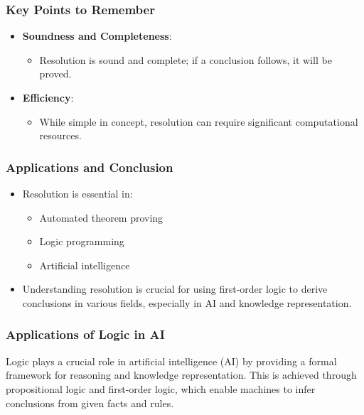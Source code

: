 \documentclass[aspectratio=169]{beamer}
\begin{document}
\begin{frame}[fragile]
    \frametitle{Key Points to Remember}
    \begin{itemize}
        \item \textbf{Soundness and Completeness}:
        \begin{itemize}
            \item Resolution is sound and complete; if a conclusion follows, it will be proved.
        \end{itemize}
        
        \item \textbf{Efficiency}:
        \begin{itemize}
            \item While simple in concept, resolution can require significant computational resources.
        \end{itemize}
    \end{itemize}
\end{frame}

\begin{frame}[fragile]
    \frametitle{Applications and Conclusion}
    \begin{itemize}
        \item Resolution is essential in:
        \begin{itemize}
            \item Automated theorem proving
            \item Logic programming
            \item Artificial intelligence
        \end{itemize}
        
        \item Understanding resolution is crucial for using first-order logic to derive conclusions in various fields, especially in AI and knowledge representation.
    \end{itemize}
\end{frame}

\begin{frame}[fragile]
    \frametitle{Applications of Logic in AI}
    Logic plays a crucial role in artificial intelligence (AI) by providing a formal framework for reasoning and knowledge representation.
    This is achieved through propositional logic and first-order logic, which enable machines to infer conclusions from given facts and rules.
\end{frame}
\end{document}
